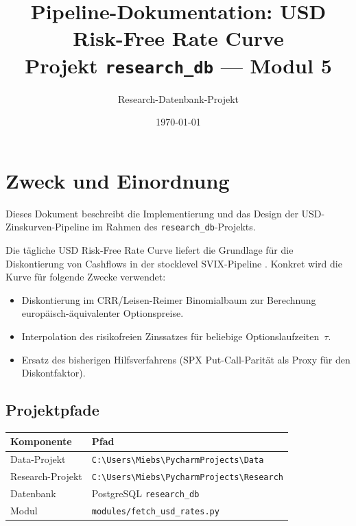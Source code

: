 \documentclass[11pt, a4paper]{article}
\title{\textbf{Pipeline-Dokumentation: USD Risk-Free Rate Curve}\\
       \large Projekt \texttt{research\_db} --- Modul 5}
\author{Research-Datenbank-Projekt}
\date{\today}
\begin{document}
\maketitle
\tableofcontents
\newpage

\section{Zweck und Einordnung}

Dieses Dokument beschreibt die Implementierung und das Design der
USD-Zinskurven-Pipeline im Rahmen des \texttt{research\_db}-Projekts.

Die tägliche USD Risk-Free Rate Curve liefert die Grundlage für die
Diskontierung von Cashflows in der stocklevel SVIX-Pipeline
\cite{martinwagner2019}. Konkret wird die Kurve für folgende Zwecke
verwendet:

\begin{itemize}
  \item Diskontierung im CRR/Leisen-Reimer Binomialbaum zur Berechnung
        europäisch-äquivalenter Optionspreise.
  \item Interpolation des risikofreien Zinssatzes für beliebige
        Optionslaufzeiten~$\tau$.
  \item Ersatz des bisherigen Hilfsverfahrens (SPX Put-Call-Parität als
        Proxy für den Diskontfaktor).
\end{itemize}

\subsection*{Projektpfade}

\begin{tabular}{ll}
  \toprule
  Komponente & Pfad \\
  \midrule
  Data-Projekt    & \texttt{C:\textbackslash Users\textbackslash Miebs\textbackslash PycharmProjects\textbackslash Data} \\
  Research-Projekt & \texttt{C:\textbackslash Users\textbackslash Miebs\textbackslash PycharmProjects\textbackslash Research} \\
  Datenbank       & PostgreSQL \texttt{research\_db} \\
  Modul           & \texttt{modules/fetch\_usd\_rates.py} \\
  \bottomrule
\end{tabular}

\end{document}
